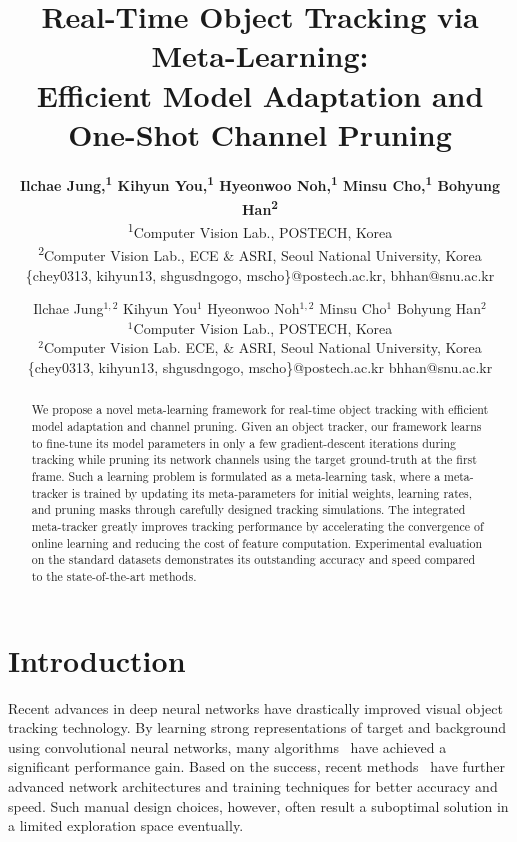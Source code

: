 \documentclass[letterpaper]{article} %
\title{Real-Time Object Tracking via Meta-Learning: \\ Efficient Model Adaptation and One-Shot Channel Pruning}
\author{
\Large \textbf{Ilchae Jung,\textsuperscript{\rm 1} Kihyun You,\textsuperscript{\rm 1} Hyeonwoo Noh,\textsuperscript{\rm 1} Minsu Cho,\textsuperscript{\rm 1} Bohyung Han\textsuperscript{\rm 2} }\\
\textsuperscript{\rm 1}Computer Vision Lab., POSTECH, Korea  \\
\textsuperscript{\rm 2}Computer Vision Lab., ECE \& ASRI, Seoul National University, Korea\\
\{chey0313, kihyun13, shgusdngogo, mscho\}@postech.ac.kr,  bhhan@snu.ac.kr
}
\author{Ilchae Jung$^{1,2}$ \hspace{0.5cm} Kihyun You$^1$ \hspace{0.5cm} Hyeonwoo Noh$^{1,2}$ \hspace{0.5cm} Minsu Cho$^1$ \hspace{0.5cm} Bohyung Han$^2$ \\
	$^1$Computer Vision Lab., POSTECH, Korea \\ 
	$^2$Computer Vision Lab. ECE, \& ASRI, Seoul National University, Korea   \\ 
	 \null \{chey0313, kihyun13, shgusdngogo, mscho\}@postech.ac.kr \hspace{1cm}  bhhan@snu.ac.kr
  \null
}
\begin{document}
\maketitle
\begin{abstract}

      We propose a novel meta-learning framework for real-time object tracking with efficient model adaptation and channel pruning. 
Given an object tracker, our framework learns to fine-tune its model parameters in only a few gradient-descent iterations during tracking while pruning its network channels using the target ground-truth at the first frame. 
Such a learning problem is formulated as a meta-learning task, where a meta-tracker is trained by updating its meta-parameters for initial weights, learning rates, and pruning masks through carefully designed tracking simulations.  
The integrated meta-tracker greatly improves tracking performance by accelerating the convergence of online learning and reducing the cost of feature computation. 
Experimental evaluation on the standard datasets demonstrates its outstanding accuracy and speed compared to the state-of-the-art methods.


\end{abstract}


\section{Introduction}
\label{sec:introduction}
Recent advances in deep neural networks have drastically improved visual object tracking technology. 
By learning strong representations of target and background using convolutional neural networks, many algorithms~\cite{nam2016learningmulti,nam2016modeling,han2017branchout,martin2016beyond,martin2017eco} have achieved a significant performance gain.
Based on the success, recent methods~\cite{danelljan2019atom,li2019siamrpn++,huang2017learning,fan2017parallel,zheng2018distractor,jung2018realtime} have further advanced network architectures and training techniques for better accuracy and speed.
Such manual design choices, however, often result a suboptimal solution in a limited exploration space eventually.
\end{document}
